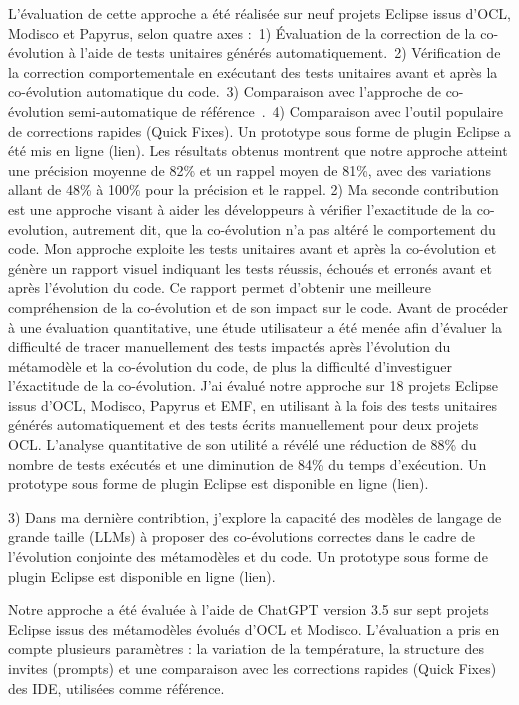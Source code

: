 L'évaluation de cette approche a été réalisée sur neuf projets Eclipse issus d'OCL, Modisco et Papyrus, selon quatre axes :~1) Évaluation de la correction de la co-évolution à l’aide de tests unitaires générés automatiquement.~2) Vérification de la correction comportementale en exécutant des tests unitaires avant et après la co-évolution automatique du code.~3) Comparaison avec l’approche de co-évolution semi-automatique de référence~\cite{Khelladi2020}.~4) Comparaison avec l’outil populaire de corrections rapides (Quick Fixes).
Un prototype sous forme de plugin Eclipse a été mis en ligne (lien). Les résultats obtenus montrent que notre approche atteint une précision moyenne de 82\% et un rappel moyen de 81\%, avec des variations allant de 48\% à 100\% pour la précision et le rappel.
2) Ma seconde contribution est une approche visant à aider les développeurs à vérifier l'exactitude de la co-evolution, autrement dit, que la co-évolution n'a pas altéré le comportement du code. Mon approche exploite les tests unitaires avant et après la co-évolution et génère un rapport visuel indiquant les tests réussis, échoués et erronés avant et après l’évolution du code. Ce rapport permet d’obtenir une meilleure compréhension de la co-évolution et de son impact sur le code.
Avant de procéder à une évaluation quantitative, une étude utilisateur a été menée afin d’évaluer la difficulté de tracer manuellement des tests impactés après l’évolution du métamodèle et la co-évolution du code, de plus la difficulté d'investiguer l'éxactitude de la co-évolution.
J'ai évalué notre approche sur 18 projets Eclipse issus d’OCL, Modisco, Papyrus et EMF, en utilisant à la fois des tests unitaires générés automatiquement et des tests écrits manuellement pour deux projets OCL. L’analyse quantitative de son utilité a révélé une réduction de 88\% du nombre de tests exécutés et une diminution de 84\% du temps d’exécution. Un prototype sous forme de plugin Eclipse est disponible en ligne (lien).



3) Dans ma dernière contribtion, j'explore la capacité des modèles de langage de grande taille (LLMs) à proposer des co-évolutions correctes dans le cadre de l’évolution conjointe des métamodèles et du code. Un prototype sous forme de plugin Eclipse est disponible en ligne (lien).

Notre approche a été évaluée à l’aide de ChatGPT version 3.5 sur sept projets Eclipse issus des métamodèles évolués d’OCL et Modisco. L’évaluation a pris en compte plusieurs paramètres : la variation de la température, la structure des invites (prompts) et une comparaison avec les corrections rapides (Quick Fixes) des IDE, utilisées comme référence.

